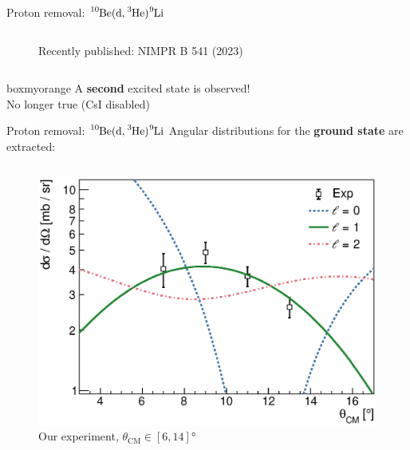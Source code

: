 \documentclass[sans,
frameno, %
mp,
usenames,dvipsnames, %
onlytextwidth, %
t,%
11pt]{beamer}
\newcommand{\iso}[2]{\ce{^{#1}#2}}
\begin{document}
\begin{frame}{Proton removal: $\iso{10}{Be}(\textrm{d}, \iso{3}{He})\iso{9}{Li}$}
\begin{columns}[t]
{\begin{figure}
                \caption{Recently published: NIMPR B 541 (2023)}
            \end{figure}
        }
    \end{columns}

    \begin{beamercolorbox}[sep=1ex,center, rounded=true, wd=0.48\linewidth]{boxmyorange}
        A \textbf{second} excited state is observed!\\
        No longer true (CsI disabled)
    \end{beamercolorbox}

\end{frame}

\begin{frame}{Proton removal: $\iso{10}{Be}(\textrm{d}, \iso{3}{He})\iso{9}{Li}$}
    Angular distributions for the \textbf{ground state} are extracted:
    \vspace{-\medskipamount}
    \begin{columns}[t]
        {
            \begin{figure}
                \captionsetup{belowskip=-8pt}
                \caption{Our experiment, $\theta_{\textrm{CM}} \in \left[6, 14\right]\unit{\degree}$}
                \includegraphics[width=\linewidth, cfbox=myorange 1pt 0pt 0pt]{figures/Workshop/10Be_d3He_xs.eps}
            \end{figure}

}
\end{columns}
\end{frame}
\end{document}
